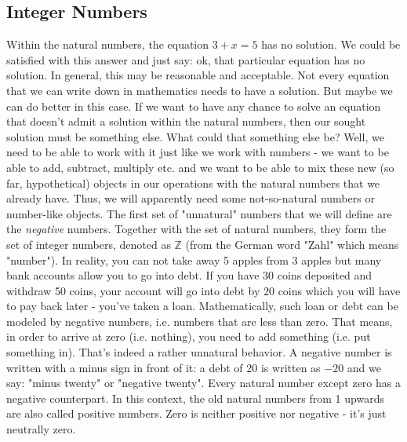
\subsection{Integer Numbers}
Within the natural numbers, the equation $3 + x = 5$ has no solution. We could be satisfied with this answer and just say: ok, that particular equation has no solution. In general, this may be reasonable and acceptable. Not every equation that we can write down in mathematics needs to have a solution. But maybe we can do better in this case. If we want to have any chance to solve an equation that doesn't admit a solution within the natural numbers, then our sought solution must be something else. What could that something else be? Well, we need to be able to work with it just like we work with numbers - we want to be able to add, subtract, multiply etc. and we want to be able to mix these new (so far, hypothetical) objects in our operations with the natural numbers that we already have. Thus, we will apparently need some not-so-natural numbers or number-like objects. The first set of "unnatural" numbers that we will define are the \emph{negative} numbers. Together with the set of natural numbers, they form the set of integer numbers, denoted as $\mathbb{Z}$ (from the German word "Zahl" which means "number"). In reality, you can not take away 5 apples from 3 apples but many bank accounts allow you to go into debt. If you have 30 coins deposited and withdraw 50 coins, your account will go into debt by 20 coins which you will have to pay back later - you've taken a loan. Mathematically, such loan or debt can be modeled by negative numbers, i.e. numbers that are less than zero. That means, in order to arrive at zero (i.e. nothing), you need to add something (i.e. put something in). That's indeed a rather unnatural behavior.  A negative number is written with a minus sign in front of it: a debt of 20 is written as $-20$ and we say: "minus twenty" or "negative twenty". Every natural number except zero has a negative counterpart. In this context, the old natural numbers from 1 upwards are also called positive numbers. Zero is neither positive nor negative - it's just neutrally zero. 

